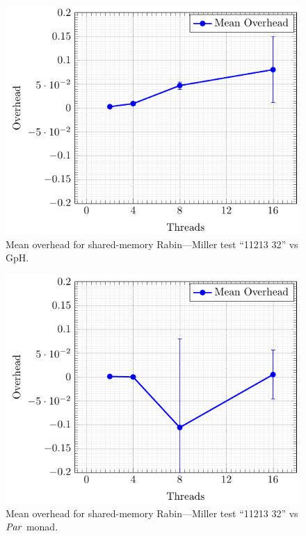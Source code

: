 \documentclass[paper=A4,twoside=true,openright,parskip=full,chapterprefix=true,headings=normal,bibliography=totoc,listof=totoc,titlepage=on,captions=tableabove,draft=false,british]{scrreprt}%
\renewcommand{\enquote}[1]{{``}#1{''}}
\begin{document}
\begin{figure}
\centering
\includegraphics{src/img/overSMRM32GpH.pdf}
\caption{Mean overhead for shared-memory Rabin---Miller test
\enquote{11213 32} vs GpH.\label{fig:overSMRM32GpH}}
\end{figure}

\begin{figure}
\centering
\includegraphics{src/img/overSMRM32Par.pdf}
\caption{Mean overhead for shared-memory Rabin---Miller test
\enquote{11213 32} vs \ensuremath{\Conid{Par}} monad.\label{fig:overSMRM32Par}}
\end{figure}
\end{document}
